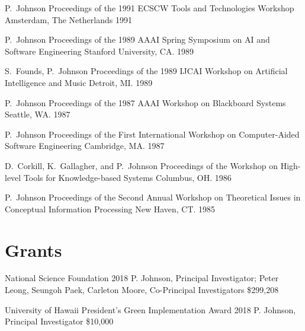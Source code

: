 \documentclass[11pt,letterpaper,sans]{moderncv} %
\begin{document}
          {P.~Johnson}
          {Proceedings of the 1991 ECSCW Tools and Technologies Workshop}
          {Amsterdam, The Netherlands 1991}

          {P.~Johnson}
          {Proceedings of the 1989 AAAI Spring Symposium on AI and Software Engineering}
          {Stanford University, CA. 1989}

          {S.~Founds, P.~Johnson}
          {Proceedings of the 1989 IJCAI Workshop on Artificial Intelligence and Music}
          {Detroit, MI. 1989}

          {P.~Johnson}
          {Proceedings of the 1987 AAAI Workshop on Blackboard Systems}
          {Seattle, WA. 1987}

          {P.~Johnson}
          {Proceedings of the First International Workshop on Computer-Aided Software Engineering}
          {Cambridge, MA. 1987}

          {D.~Corkill, K.~Gallagher, and P.~Johnson}
          {Proceedings of the Workshop on High-level Tools for Knowledge-based Systems}
          {Columbus, OH. 1986}

          {P.~Johnson}
          {Proceedings of the Second Annual Workshop on Theoretical Issues in Conceptual Information Processing}
          {New Haven, CT.  1985}

\section{Grants}

        {National Science Foundation} %
        {2018} %
        {P. Johnson, Principal Investigator; Peter Leong, Seungoh Paek, Carleton Moore, Co-Principal Investigators}  %
        {\$299,208} %

        {University of Hawaii President's Green Implementation Award} %
        {2018} %
        {P. Johnson, Principal Investigator}  %
        {\$10,000} %
\end{document}
